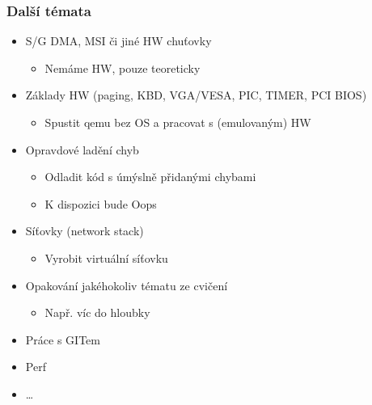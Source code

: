\begin{frame}
  \frametitle{Další témata}

  \begin{itemize}
  \item S/G DMA, MSI či jiné HW chuťovky
  \begin{itemize}
  \item Nemáme HW, pouze teoreticky
  \end{itemize}
  \item Základy HW (paging, KBD, VGA/VESA, PIC, TIMER, PCI BIOS)
  \begin{itemize}
  \item Spustit qemu bez OS a pracovat s (emulovaným) HW
  \end{itemize}
  \item Opravdové ladění chyb
  \begin{itemize}
  \item Odladit kód s úmýslně přidanými chybami
  \item K dispozici bude Oops
  \end{itemize}
  \item Síťovky (network stack)
  \begin{itemize}
  \item Vyrobit virtuální síťovku
  \end{itemize}
  \item Opakování jakéhokoliv tématu ze cvičení
  \begin{itemize}
  \item Např. víc do hloubky
  \end{itemize}
  \item Práce s GITem
  \item Perf
  \item \ldots
  \end{itemize}

\end{frame}



